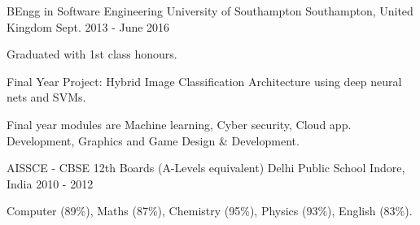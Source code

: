 

\begin{cventries}
	
	\cventry
		{BEngg in Software Engineering} %
		{University of Southampton} %
		{Southampton, United Kingdom} %
		{Sept. 2013 - June 2016} %
		{
		\begin{cvitems} %
			\item {Graduated with 1st class honours.}
			\item {Final Year Project: Hybrid Image Classification Architecture using deep neural nets and SVMs.}
			\item {Final year modules are Machine learning, Cyber security, Cloud app. Development, Graphics and Game Design \& Development.}
		\end{cvitems}
		}
		
		
		
	
	\cventry
	{AISSCE - CBSE 12th Boards (A-Levels equivalent)} %
	{Delhi Public School} %
	{Indore, India} %
	{2010 - 2012} %
	{
		\begin{cvitems} %
			\item {Computer (89\%), Maths (87\%), Chemistry (95\%), Physics (93\%), English (83\%).}
		\end{cvitems}
	}
	
	
	
\end{cventries}